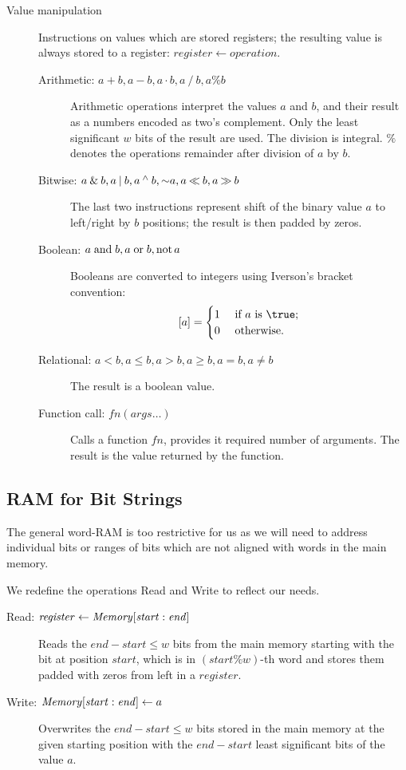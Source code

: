 \begin{description}
	\item[Value manipulation]
	Instructions on values which are stored registers; the resulting value is always stored to a register: $\mathit{register} \gets \mathit{operation}$.
	\begin{description}
		\item[Arithmetic: $a + b, a - b, a \cdot b, a \mathbin{/} b, a \% b$]
		Arithmetic operations interpret the values $a$ and $b$, and their result as a numbers encoded as two's complement.
		Only the least significant $w$ bits of the result are used.
		The division is integral. $\%$ denotes the operations remainder after division of $a$ by $b$.
		\item[Bitwise: $a \mathbin{\&} b, a \mathbin{|} b, a \mathbin{^\wedge} b, \mathord{\sim} a, a \mathbin{\ll} b, a \mathbin{\gg} b$]
		The last two instructions represent shift of the binary value $a$ to left/right by $b$ positions; the result is then padded by zeros.
		\item[Boolean: \textnormal{$a \mathrel{\textrm{and}} b, a \mathrel{\textrm{or}} b, \mathord{\textrm{not}\,} a$}]
		Booleans are converted to integers using Iverson's bracket convention:
		$$[a] = \begin{cases}
			1 & \textif a \textrm{ is } \true; \\ 
			0 & \textotherwise.
		\end{cases}$$
		\item[Relational: $a < b, a \le b, a > b, a \ge b, a = b, a \ne b$]
		The result is a boolean value.
		\item[Function call: $\mathit{fn}(\mathit{args}\ldots)$]
		Calls a function $\mathit{fn}$, provides it required number of arguments.
		The result is the value returned by the function.
	\end{description}
\end{description}

\subsection{RAM for Bit Strings}

The general word-RAM is too restrictive for us as we will need to address individual bits or ranges of bits which are not aligned with words in the main memory.

We redefine the operations Read and Write to reflect our needs.
\begin{description}
	\item[Read: $\mathit{register} \gets \mathit{Memory}[\mathit{start}:\mathit{end}\char93$]
	Reads the $\mathit{end} - \mathit{start} \le w$ bits from the main memory starting with the bit at position $\mathit{start}$, which is in $(\mathit{start} \% w)$-th word and stores them padded with zeros from left in a $register$.
	
	\item[Write: $\mathit{Memory}[\mathit{start}:\mathit{end}\char93 \gets a$]
	Overwrites the $\mathit{end} - \mathit{start} \le w$ bits stored in the main memory at the given starting position with the $\mathit{end} - \mathit{start}$ least significant bits of the value $a$.
\end{description}

